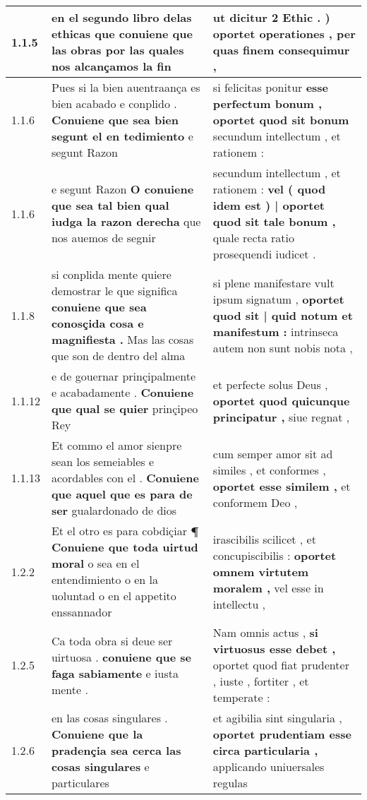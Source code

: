 \begin{tabular}{|p{1cm}|p{6.5cm}|p{6.5cm}|}

\hline
1.1.5 & en el segundo libro delas ethicas \textbf{ que conuiene que las obras } por las quales nos alcançamos la fin & ut dicitur 2 Ethic . ) \textbf{ oportet operationes , } per quas finem consequimur , \\\hline
1.1.6 & Pues si la bien auentraança es bien acabado e conplido . \textbf{ Conuiene que sea bien segunt el en tedimiento } e segunt Razon & si felicitas ponitur \textbf{ esse perfectum bonum , oportet quod sit bonum } secundum intellectum , et rationem : \\\hline
1.1.6 & e segunt Razon \textbf{ O conuiene que sea tal bien qual iudga la razon derecha } que nos auemos de segnir & secundum intellectum , et rationem : \textbf{ vel ( quod idem est ) | oportet quod sit tale bonum , } quale recta ratio prosequendi iudicet . \\\hline
1.1.8 & si conplida mente quiere demostrar le que significa \textbf{ conuiene que sea conosçida cosa e magnifiesta . } Mas las cosas que son de dentro del alma & si plene manifestare vult ipsum signatum , \textbf{ oportet quod sit | quid notum et manifestum : } intrinseca autem non sunt nobis nota , \\\hline
1.1.12 & e de gouernar prinçipalmente e acabadamente . \textbf{ Conuiene que qual se quier } prinçipeo Rey & et perfecte solus Deus , \textbf{ oportet quod quicunque principatur , } siue regnat , \\\hline
1.1.13 & Et commo el amor sienpre sean los semeiables e acordables con el . \textbf{ Conuiene que aquel que es para de ser } gualardonado de dios & cum semper amor sit ad similes , et conformes , \textbf{ oportet esse similem , } et conformem Deo , \\\hline
1.2.2 & Et el otro es para cobdiçiar \textbf{ ¶ Conuiene que toda uirtud moral } o sea en el entendimiento o en la uoluntad o en el appetito enssannador & irascibilis scilicet , et concupiscibilis : \textbf{ oportet omnem virtutem moralem , } vel esse in intellectu , \\\hline
1.2.5 & Ca toda obra si deue ser uirtuosa . \textbf{ conuiene que se faga sabiamente } e iusta mente . & Nam omnis actus , \textbf{ si virtuosus esse debet , } oportet quod fiat prudenter , iuste , fortiter , et temperate : \\\hline
1.2.6 & en las cosas singulares . \textbf{ Conuiene que la pradençia sea cerca las cosas singulares } e particulares & et agibilia sint singularia , \textbf{ oportet prudentiam esse circa particularia , } applicando uniuersales regulas \\\hline

\end{tabular}
